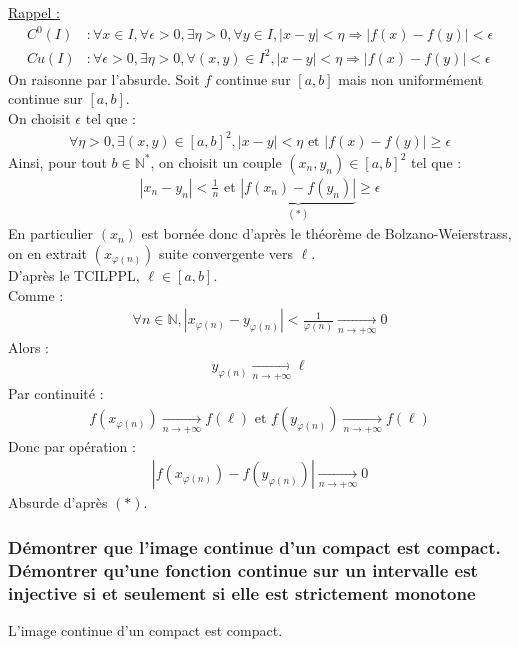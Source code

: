 \documentclass[titlepage, twoside]{report}
\begin{document}
\noindent \underline{Rappel :}
\begin{align*}
    C^0(I) &: \forall x \in I, \forall \epsilon > 0, \exists \eta > 0, \forall y \in I, |x-y| < \eta \Rightarrow |f(x) - f(y)| < \epsilon \\
    Cu(I) &: \forall \epsilon > 0, \exists \eta > 0, \forall (x,y) \in I^2, |x-y| < \eta \Rightarrow |f(x) - f(y)| < \epsilon
\end{align*}
On raisonne par l'absurde. Soit $f$ continue sur $[a,b]$ mais non uniformément continue sur $[a,b]$. \\
On choisit $\epsilon$ tel que : 
\begin{align*}
    \forall \eta > 0, \exists (x, y) \in [a,b]^2, |x - y| < \eta \text{ et } |f(x) - f(y)| \geq \epsilon
\end{align*}
Ainsi, pour tout $b \in \mathbb{N}^*$, on choisit un couple $(x_n, y_n) \in [a,b]^2$ tel que : 
\begin{align*}
    |x_n - y_n| < \frac{1}{n} \text{ et } \underbrace{|f(x_n) - f(y_n)|}_{(*)} \geq \epsilon
\end{align*}
En particulier $(x_n)$ est bornée donc d'après le théorème de Bolzano-Weierstrass, on en extrait $(x_{\varphi(n)})$ suite convergente vers $\ell$. \\
D'après le TCILPPL, $\ell \in [a,b]$. \\
Comme : 
\begin{align*}
    \forall n \in \mathbb{N}, |x_{\varphi(n)} - y_{\varphi(n)}| < \frac{1}{\varphi(n)} \underset{n \to +\infty}{\longrightarrow} 0
\end{align*}
Alors : 
\begin{align*}
    y_{\varphi(n)} \underset{n \to +\infty}{\longrightarrow} \ell
\end{align*}
Par continuité : 
\begin{align*}
    f(x_{\varphi(n)}) \underset{n \to +\infty}{\longrightarrow} f(\ell) \text{ et } f(y_{\varphi(n)}) \underset{n \to +\infty}{\longrightarrow} f(\ell)
\end{align*}
Donc par opération : 
\begin{align*}
    |f(x_{\varphi(n)}) - f(y_{\varphi(n)})| \underset{n \to +\infty}{\longrightarrow} 0
\end{align*}
Absurde d'après $(*)$. 

\subsubsection{Démontrer que l'image continue d'un compact est compact. Démontrer qu'une fonction continue sur un intervalle est injective si et seulement si elle est strictement monotone}
\begin{tcolorbox}[title=Lemme 15.68, title filled=false, colframe=orange, colback=orange!10!white]
    L'image continue d'un compact est compact. 
\end{tcolorbox}
\end{document}
